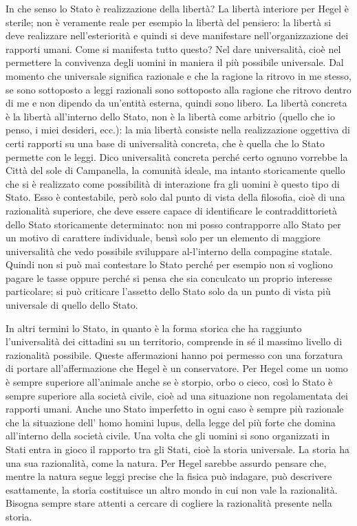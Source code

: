 \documentclass[a4paper,12pt,oneside,openany]{book}%
\begin{document}
In che senso lo Stato è realizzazione della libertà? La libertà interiore per Hegel è sterile; non è veramente reale per esempio la libertà del pensiero: la libertà si deve realizzare nell’esteriorità e quindi si deve manifestare nell’organizzazione dei rapporti umani. Come si manifesta tutto questo? Nel dare universalità, cioè nel permettere la convivenza degli uomini in maniera il più possibile universale. Dal momento che universale significa razionale e che la ragione la ritrovo in me stesso, se sono sottoposto a leggi razionali sono sottoposto alla ragione che ritrovo dentro di me e non dipendo da un’entità esterna, quindi sono libero. La libertà concreta è la libertà all’interno dello Stato, non è la libertà come arbitrio (quello che io penso, i miei desideri, ecc.): la mia libertà consiste nella realizzazione oggettiva di certi rapporti su una base di universalità concreta, che è quella che lo Stato permette con le leggi. Dico universalità concreta perché certo ognuno vorrebbe la Città del sole di Campanella, la comunità ideale, ma intanto storicamente quello che si è realizzato come possibilità di interazione fra gli uomini è questo tipo di Stato. Esso è contestabile, però solo dal punto di vista della filosofia, cioè di una razionalità superiore, che deve essere capace di identificare le contraddittorietà dello Stato storicamente determinato: non mi posso contrapporre allo Stato per un motivo di carattere individuale, bensì solo per un elemento di maggiore universalità che vedo possibile sviluppare al-l’interno della compagine statale. Quindi non si può mai contestare lo Stato perché per esempio non si vogliono pagare le tasse oppure perché si pensa che sia conculcato un proprio interesse particolare; si può criticare l’assetto dello Stato solo da un punto di vista più universale di quello dello Stato.

In altri termini lo Stato, in quanto è la forma storica che ha raggiunto l’universalità dei cittadini su un territorio, comprende in sé il massimo livello di razionalità possibile. Queste affermazioni hanno poi permesso con una forzatura di portare all’affermazione che Hegel è un conservatore. Per Hegel come un uomo è sempre superiore all’animale anche se è storpio, orbo o cieco, così lo Stato è sempre superiore alla società civile, cioè ad una situazione non regolamentata dei rapporti umani. Anche uno Stato imperfetto in ogni caso è sempre più razionale che la situazione dell’ homo homini lupus, della legge del più forte che domina all’interno della società civile. Una volta che gli uomini si sono organizzati in Stati entra in gioco il rapporto tra gli Stati, cioè la storia universale. La storia ha una sua razionalità, come la natura. Per Hegel sarebbe assurdo pensare che, mentre la natura segue leggi precise che la fisica può indagare, può descrivere esattamente, la storia costituisce un altro mondo in cui non vale la razionalità. Bisogna sempre stare attenti a cercare di cogliere la razionalità presente nella storia.
\end{document}
